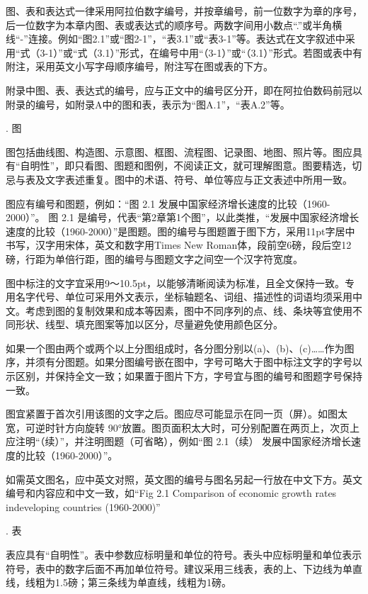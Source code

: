 \documentclass{Diploma}
\begin{document}
图、表和表达式一律采用阿拉伯数字编号，并按章编号，前一位数字为章的序号，后一位数字为本章内图、表或表达式的顺序号。两数字间用小数点“.”或半角横线“-”连接。例如“图2.1”或“图2-1”，“表3.1”或“表3-1”等。表达式在文字叙述中采用“式（3-1）”或“式（3.1）”形式，在编号中用“（3-1）”或“（3.1）”形式。若图或表中有附注，采用英文小写字母顺序编号，附注写在图或表的下方。

附录中图、表、表达式的编号，应与正文中的编号区分开，即在阿拉伯数码前冠以附录的编号，如附录A中的图和表，表示为“图A.1”，“表A.2”等。

. 图

图包括曲线图、构造图、示意图、框图、流程图、记录图、地图、照片等。图应具有“自明性”，即只看图、图题和图例，不阅读正文，就可理解图意。图要精选，切忌与表及文字表述重复。图中的术语、符号、单位等应与正文表述中所用一致。

图应有编号和图题，例如：“图 2.1 发展中国家经济增长速度的比较（1960-2000）”。 图 2.1 是编号，代表“第2章第1个图”，以此类推，“发展中国家经济增长速度的比较（1960-2000）”是图题。图的编号与图题置于图下方，采用11pt字居中书写，汉字用宋体，英文和数字用Times New Roman体，段前空6磅，段后空12磅，行距为单倍行距，图的编号与图题文字之间空一个汉字符宽度。

图中标注的文字宜采用9～10.5pt，以能够清晰阅读为标准，且全文保持一致。专用名字代号、单位可采用外文表示，坐标轴题名、词组、描述性的词语均须采用中文。考虑到图的复制效果和成本等因素，图中不同序列的点、线、条块等宜使用不同形状、线型、填充图案等加以区分，尽量避免使用颜色区分。

如果一个图由两个或两个以上分图组成时，各分图分别以(a)、(b)、(c)……作为图序，并须有分图题。如果分图编号嵌在图中，字号可略大于图中标注文字的字号以示区别，并保持全文一致；如果置于图片下方，字号宜与图的编号和图题字号保持一致。

图宜紧置于首次引用该图的文字之后。图应尽可能显示在同一页（屏）。如图太宽，可逆时针方向旋转 90°放置。图页面积太大时，可分别配置在两页上，次页上应注明“（续）”，并注明图题（可省略），例如“图 2.1（续） 发展中国家经济增长速度的比较（1960-2000）”。

如需英文图名，应中英文对照，英文图的编号与图名另起一行放在中文下方。英文编号和内容应和中文一致，如“Fig 2.1 Comparison of economic growth rates indeveloping countries (1960-2000)”

. 表

表应具有“自明性”。表中参数应标明量和单位的符号。表头中应标明量和单位表示符号，表中的数字后面不再加单位符号。建议采用三线表，表的上、下边线为单直线，线粗为1.5磅；第三条线为单直线，线粗为1磅。
\end{document}
